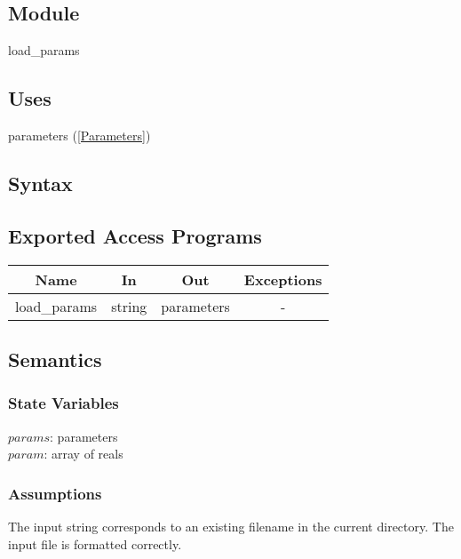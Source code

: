 \documentclass[12pt]{article}
\begin{document}
\subsection{Module}
load\_params
\subsection{Uses}
parameters (\ref{Parameters})
\subsection{Syntax}
\subsection{Exported Access Programs}
\begin{center}
\begin{tabular}{c c c c}
\hline
\textbf{Name} & \textbf{In} & \textbf{Out} & \textbf{Exceptions} \\
\hline
load\_params & string & parameters &  - \\
\hline
\end{tabular}
\end{center}
\subsection{Semantics}
\subsubsection{State Variables}
$params$: parameters \\
$param$: array of reals
\subsubsection{Assumptions}
The input string corresponds to an existing filename in the current directory. The input file is formatted correctly.
\end{document}
